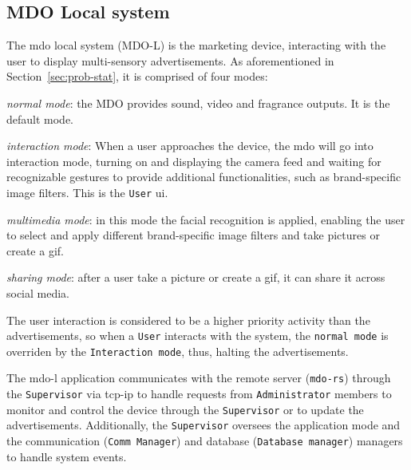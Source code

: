 \subsection{MDO Local system}
\label{sec:mdo-local-system}
The \gls{mdo} local system (MDO-L) is the marketing device, interacting with the user
to display multi-sensory advertisements. As aforementioned in
Section~\ref{sec:prob-stat}, it is comprised of four modes:
\begin{item-c}
\item \emph{normal mode}: the MDO provides sound, video and fragrance
  outputs. It is the default mode.
\item \emph{interaction mode}: When a user approaches the device, the \gls{mdo} will
go into interaction mode, turning on and displaying the camera feed and waiting
for recognizable gestures to provide additional functionalities, such as
brand-specific image filters. This is the \texttt{User} \gls{ui}.
\item \emph{multimedia mode}: in this mode the facial recognition is applied,
  enabling the user to select and apply different brand-specific image filters and take pictures or create a \gls{gif}.
\item \emph{sharing mode}: after a user take a picture or create a \gls{gif}, it
  can share it across social media.
\end{item-c}

The user interaction is considered to be a higher priority activity than the
advertisements, so when a \texttt{User} interacts with the system, the \texttt{normal
mode} is overriden by the \texttt{Interaction mode}, thus, halting the
advertisements.

The \gls{mdo-l} application communicates with the remote server
(\texttt{\gls{mdo-rs}}) through the \texttt{Supervisor} via \gls{tcp-ip}
 to handle requests from \texttt{Administrator} members
to monitor and control the device through the \texttt{Supervisor} or to update
the advertisements. Additionally, the \texttt{Supervisor} oversees the
application mode and the communication (\texttt{Comm Manager}) and database
(\texttt{Database manager}) managers to handle system events.
%
